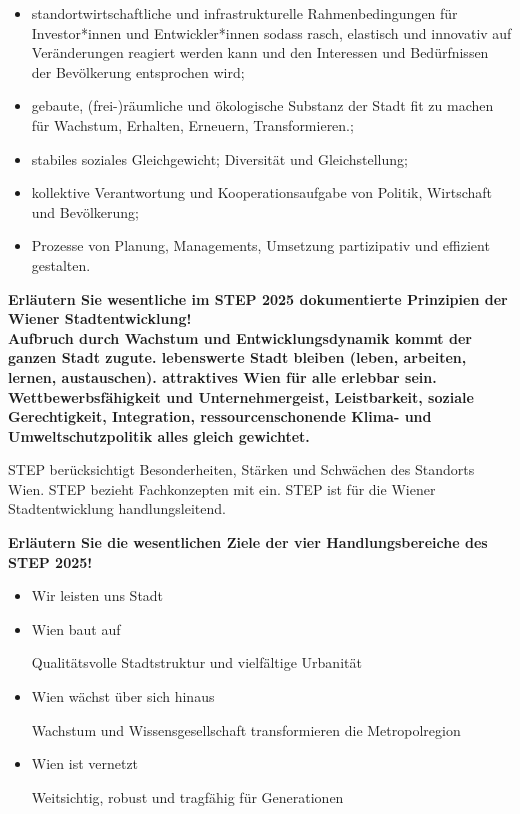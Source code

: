 \documentclass[]{article}
\newenvironment{question}{\vspace{8mm}\noindent\bfseries}{\\}
\begin{document}
\begin{itemize}
	\item standortwirtschaftliche und infrastrukturelle Rahmenbedingungen für Investor*innen und Entwickler*innen sodass rasch, elastisch und innovativ auf Veränderungen reagiert werden kann und den Interessen und Bedürfnissen der Bevölkerung entsprochen wird;
	\item gebaute, (frei-)räumliche und ökologische Substanz der Stadt fit zu machen für Wachstum, Erhalten, Erneuern, Transformieren.;
	\item stabiles soziales Gleichgewicht; Diversität und Gleichstellung;
	\item kollektive Verantwortung und Kooperationsaufgabe von Politik, Wirtschaft und Bevölkerung;
	\item Prozesse von Planung, Managements, Umsetzung partizipativ und effizient gestalten.
\end{itemize}

\begin{question}
	Erläutern Sie wesentliche im STEP 2025 dokumentierte Prinzipien der Wiener Stadtentwicklung!
\end{question}
Aufbruch durch Wachstum und Entwicklungsdynamik kommt der ganzen Stadt zugute. lebenswerte Stadt bleiben (leben, arbeiten, lernen, austauschen). attraktives Wien für alle erlebbar sein.
Wettbewerbsfähigkeit und Unternehmergeist, Leistbarkeit, soziale Gerechtigkeit, Integration, ressourcenschonende Klima- und Umweltschutzpolitik alles gleich gewichtet.

STEP berücksichtigt Besonderheiten, Stärken und Schwächen des Standorts Wien.
STEP bezieht Fachkonzepten mit ein.
STEP ist für die Wiener Stadtentwicklung handlungsleitend.

\begin{question}
	Erläutern Sie die wesentlichen Ziele der vier Handlungsbereiche des STEP 2025!
\end{question}
\begin{itemize}
	\item Wir leisten uns Stadt
	
	\item Wien baut auf
	
	Qualitätsvolle Stadtstruktur und vielfältige Urbanität
	
	\item Wien wächst über sich hinaus
	
	Wachstum und Wissensgesellschaft transformieren die Metropolregion
	
	\item Wien ist vernetzt
	
	Weitsichtig, robust und tragfähig für Generationen
\end{itemize}
\end{document}
